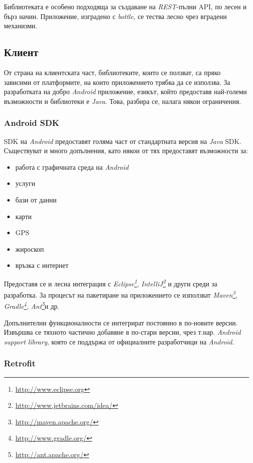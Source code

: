 		Библиотеката е особено подходяща за създаване на \emph{REST}-пълни \ac{API}, по лесен и бърз начин. Приложение, изградено с \emph{bottle}, се тества лесно чрез вградени механизми.
		
	\subsection{Клиент}
		
		От страна на клиентската част, библиотеките, които се ползват, са пряко зависими от платформите, на които приложението трябва да се използва.	
		За разработката на добро \emph{Android} приложение, езикът, който предоставя най-големи възможности и библиотеки е \emph{Java}. Това, разбира се, налага някои ограничения.
		
		\subsubsection{Android SDK}

		\ac{SDK} на \emph{Android} предоставят голяма част от стандартната версия на \emph{Java} \ac{SDK}. Съществуват и много допълнения, като някои от тях предоставят възможности за:
		
		\begin{itemize}
			\item работа с графичната среда на \emph{Android}
			\item услуги
			\item бази от данни
			\item карти
			\item GPS
			\item жироскоп
			\item връзка с интернет
		\end{itemize}
		
		Предоставя се и лесна интеграция с \emph{Eclipse\footnote{\url{http://www.eclipse.org}}}, \emph{IntelliJ\footnote{\url{http://www.jetbrains.com/idea/}}} и други среди за разработка. За процесът на пакетиране на приложението се използват \emph{Maven\footnote{\url{http://maven.apache.org/}}}, \emph{Gradle\footnote{\url{http://www.gradle.org/}}}, \emph{Ant\footnote{\url{http://ant.apache.org/}}}и др.
		
		Допълнителни функционалности се интегрират постоянно в по-новите версии. Извършва се тяхното частично добавяне в по-стари версии, чрез т.нар. \emph{Android support library}, която се поддържа от официалните разработчици на \emph{Android}.
		
		\subsubsection{Retrofit}
		
